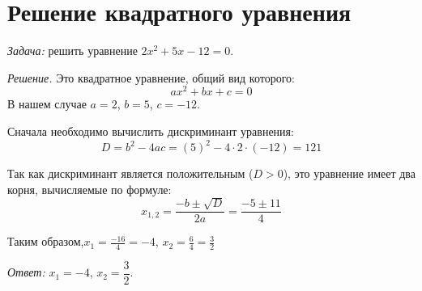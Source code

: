 \documentclass{article}
\begin{document}
\section{Решение квадратного уравнения}
\textit{Задача:} решить уравнение \( 2x^2 + 5x - 12 = 0 \).

\textit{Решение.} Это квадратное уравнение, общий вид которого:
\[
ax^2 + bx + c = 0
\]
В нашем случае \( a = 2 \), \( b = 5 \), \( c = -12 \).

Сначала необходимо вычислить дискриминант уравнения:
\[
D = b^2 - 4ac = (5)^2 - 4 \cdot 2 \cdot (-12) = 121
\]

Так как дискриминант является положительным (\( D > 0 \)), это уравнение имеет два корня, вычисляемые по формуле:
\[
x_{1,2} = \frac{-b \pm \sqrt{D}}{2a} = \frac{-5 \pm 11}{4}
\]

Таким образом,\(x_1 = \frac{-16}{4} = -4\), \(x_2 = \frac{6}{4} = \frac{3}{2}\)

\textit{Ответ:} \( x_1 = -4 \), \( x_2 = \dfrac{3}{2} \).
\end{document}

